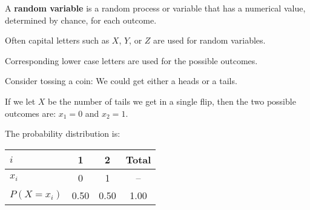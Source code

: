 \documentclass{beamer}
\newcommand{\prob}[1]{P\left({#1}\right)}
\begin{document}
\begin{frame}
\begin{definition}
A \textbf{random variable} is a random process or variable that has a numerical value, determined by chance, for each outcome.
\end{definition}\pause

\begin{note}
Often capital letters such as $X$, $Y$, or $Z$ are used for random variables.

\vspace{1mm}
Corresponding lower case letters are used for the possible outcomes.
\end{note}\pause

\begin{example}
Consider tossing a coin: We could get either a heads or a tails.\pause

\vspace{1mm}
If we let $X$ be the number of tails we get in a single flip, then the two possible outcomes are: $x_1=0$ and $x_2=1$.\pause

\vspace{2mm}
The probability distribution is:
\begin{center}
\begin{tabular}{lccc}\hline
$i$ & 1 & 2 & Total \\\hline
$x_i$ & 0 & 1 & -- \\
$\prob{X=x_i}$ & 0.50 & 0.50 & 1.00 \\\hline
\end{tabular}
\end{center}
\end{example}
\end{frame}
\end{document}
